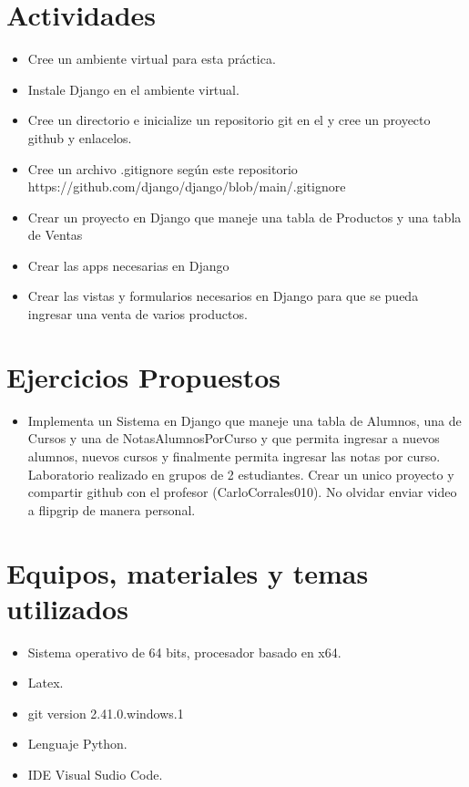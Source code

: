 \documentclass{article}
\begin{document}
	\section{Actividades}
	\begin{itemize}		
		\item Cree un ambiente virtual para esta práctica.
		\item	Instale Django en el ambiente virtual.
		\item	Cree un directorio e inicialize un repositorio git en el y cree un proyecto github y enlacelos.
		\item	Cree un archivo .gitignore según este repositorio \\
		https://github.com/django/django/blob/main/.gitignore
		\item	Crear un proyecto en Django que maneje una tabla de Productos y una tabla de Ventas
		\item	Crear las apps necesarias en Django
		\item	Crear las vistas y formularios necesarios en Django para que se pueda ingresar una venta de varios productos.
		
	\end{itemize}
	
	\section{Ejercicios Propuestos}
	\begin{itemize}	
	
		\item Implementa un Sistema en Django que maneje una tabla de Alumnos, una de Cursos y una de NotasAlumnosPorCurso y que permita ingresar a nuevos alumnos, nuevos cursos y finalmente permita ingresar las notas por curso.
		Laboratorio realizado en grupos de 2 estudiantes.  Crear un unico proyecto y compartir github con el profesor (CarloCorrales010).
		No olvidar enviar video a flipgrip de manera personal.
		
		
	\end{itemize}
	
	\section{Equipos, materiales y temas utilizados}
	\begin{itemize}
		\item Sistema operativo de 64 bits, procesador basado en x64.
		\item Latex. 
		\item git version 2.41.0.windows.1
		\item Lenguaje Python.
		\item IDE Visual Sudio Code.
	\end{itemize}
\end{document}
